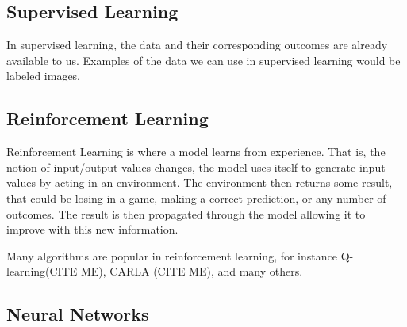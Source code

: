 

\subsection{Supervised Learning}

In supervised learning, the data and their corresponding outcomes are already available to us. Examples of the data we can use in supervised learning would be labeled images.

\subsection{Reinforcement Learning}

Reinforcement Learning is where a model learns from experience. That is, the notion of input/output values changes, the model uses itself to generate input values by acting in an environment. The environment then returns some result, that could be losing in a game, making a correct prediction, or any number of outcomes. The result is then propagated through the model allowing it to improve with this new information.

Many algorithms are popular in reinforcement learning, for instance Q-learning(CITE ME), CARLA (CITE ME),
and many others.

\subsection{Neural Networks}

